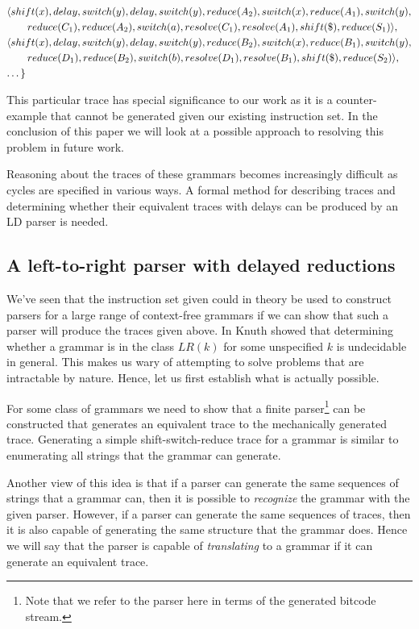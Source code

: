 \documentclass[a4paper,11pt]{article}
\begin{document}
{{\begin{align*}
   & \langle shift(x), delay, switch(y), delay, switch(y), reduce(A_2), switch(x), reduce(A_1), switch(y), \\ & \qquad reduce(C_1), reduce(A_2), switch(a), resolve(C_1), resolve(A_1), shift(\$), reduce(S_1) \rangle,\\
   & \langle shift(x), delay, switch(y), delay, switch(y), reduce(B_2), switch(x), reduce(B_1), switch(y), \\ & \qquad reduce(D_1), reduce(B_2), switch(b), resolve(D_1), resolve(B_1), shift(\$), reduce(S_2) \rangle,\\
   & \textellipsis \}
\end{align*}}}

This particular trace has special significance to our work as it is a counter-example that cannot be generated given our existing instruction set.
In the conclusion of this paper we will look at a possible approach to resolving this problem in future work.

Reasoning about the traces of these grammars becomes increasingly difficult as cycles are specified in various ways.
A formal method for describing traces and determining whether their equivalent traces with delays can be produced by an LD parser is needed.

\subsection{A left-to-right parser with delayed reductions}
We've seen that the instruction set given could in theory be used to construct parsers for a large range of context-free grammars if we can show that such a parser will produce the traces given above.
In \cite{knuth65} Knuth showed that determining whether a grammar is in the class $LR(k)$ for some unspecified $k$ is undecidable in general. 
This makes us wary of attempting to solve problems that are intractable by nature. 
Hence, let us first establish what is actually possible.

For some class of grammars we need to show that a finite parser\footnote{Note that we refer to the parser here in terms of the generated bitcode stream.} can be constructed that generates an equivalent trace to the mechanically generated trace.
Generating a simple shift-switch-reduce trace for a grammar is similar to enumerating all strings that the grammar can generate.

Another view of this idea is that if a parser can generate the same sequences of strings that a grammar can, then it is possible to \emph{recognize} the grammar with the given parser.
However, if a parser can generate the same sequences of traces, then it is also capable of generating the same structure that the grammar does.
Hence we will say that the parser is capable of \emph{translating} to a grammar if it can generate an equivalent trace.
\end{document}
